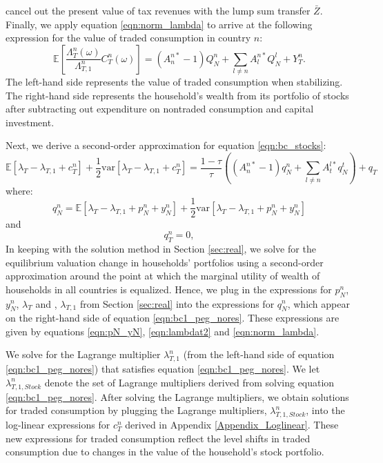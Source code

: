 cancel out the present value of tax revenues with the lump sum
transfer $\bar{Z}$. Finally, we apply equation \eqref{eqn:norm_lambda}
to arrive at the following expression for the value of traded
consumption in country $n$:
\begin{equation}
  \mathbb{E}\left[
    \frac{\Lambda^n_T(\omega)}{\Lambda^n_{T, 1}} C^n_T(\omega) 
  \right]
  = \left( A^{n \ast}_n - 1 \right) Q^n_N
  + \sum_{l \neq n} A^{n \ast}_l Q^l_N + Y^n_T.
  \label{eqn:bc_stocks}
\end{equation}
The left-hand side represents the value of traded consumption when
stabilizing. The right-hand side represents the household's wealth
from its portfolio of stocks after subtracting out expenditure on
nontraded consumption and capital investment.

Next, we derive a second-order approximation for equation
\eqref{eqn:bc_stocks}:
\begin{equation}
  \mathbb{E} \left[ \lambda_T - \lambda_{T, 1} + c^n_T \right] +
  \frac{1}{2} \text {var} \left[ \lambda_T - \lambda_{T, 1} + c^n_T
  \right] = \frac{1-\tau}{\tau} \left( \left( A^{n \ast}_n - 1 \right)
    q^n_N + \sum_{l \neq n}A^{l \ast}_t q^t_N \right) + q_T
  \label{eqn:bc1_peg_nores}
\end{equation}
where:
\begin{equation*}
  q_N^n = \mathbb{E} \left[ \lambda_T - \lambda_{T, 1} + p^n_N + y^n_N \right]
  + \frac{1}{2} \text{var} \left[ \lambda_T - \lambda_{T, 1} + p^n_N + y^n_N \right]
\end{equation*}
and
\begin{equation*}
  q_T^n = 0,
\end{equation*}
In keeping with the solution method in Section \ref{sec:real}, we
solve for the equilibrium valuation change in households' portfolios
using a second-order approximation around the point at which the
marginal utility of wealth of households in all countries is
equalized. Hence, we plug in the expressions for $p^n_N$, $y^n_N$,
$\lambda_{T}$ and , $\lambda_{T, 1}$ from Section \ref{sec:real} into
the expressions for $q^n_N$, which appear on the right-hand side of
equation \eqref{eqn:bc1_peg_nores}. These expressions are given by
equations \eqref{eqn:pN_yN}, \eqref{eqn:lambdat2} and
\eqref{eqn:norm_lambda}.

We solve for the Lagrange multiplier $\lambda^n_{T, 1}$ (from the
left-hand side of equation \eqref{eqn:bc1_peg_nores}) that satisfies
equation \eqref{eqn:bc1_peg_nores}. We let $\lambda^n_{T, 1, Stock}$
denote the set of Lagrange multipliers derived from solving equation
\eqref{eqn:bc1_peg_nores}. After solving the Lagrange multipliers, we
obtain solutions for traded consumption by plugging the Lagrange
multipliers, $\lambda^n_{T, 1, Stock}$, into the log-linear
expressions for $c^n_T$ derived in Appendix \ref{Appendix_Loglinear}.
These new expressions for traded consumption reflect the level shifts
in traded consumption due to changes in the value of the household's
stock portfolio.

